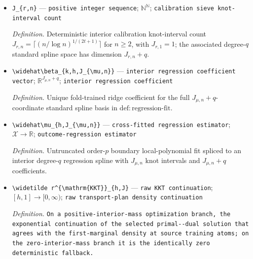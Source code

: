 \documentclass{article}
\begin{document}
\begin{itemize}
  \item \texttt{J\_\allowbreak{}\{r,\allowbreak{}n\}\allowbreak{}} --- \texttt{positive integer sequence}; \(\mathbb N^\mathbb N\); \texttt{calibration sieve knot-\allowbreak{}interval count}
  \par\smallskip\noindent\emph{Definition.} Deterministic interior calibration knot-interval count \(J_{r,n}=\lceil(n/\log n)^{1/(2t+1)}\rceil\) for \(n\ge2\), with \(J_{r,1}=1\); the associated degree-\(q\) standard spline space has dimension \(J_{r,n}+q\).
  \item \texttt{\textbackslash{}\allowbreak{}widehat\textbackslash{}\allowbreak{}beta\_\allowbreak{}\{k,\allowbreak{}h,\allowbreak{}J\_\allowbreak{}\{\textbackslash{}\allowbreak{}mu,\allowbreak{}n\}\allowbreak{}\}\allowbreak{}} --- \texttt{interior regression coefficient vector}; \(\mathbb R^{J_{\mu,n}+q}\); \texttt{interior regression coefficient}
  \par\smallskip\noindent\emph{Definition.} Unique fold-trained ridge coefficient for the full \(J_{\mu,n}+q\)-coordinate standard spline basis in \(\mathrm{def:regression\text{-}fit}\).
  \item \texttt{\textbackslash{}\allowbreak{}widehat\textbackslash{}\allowbreak{}mu\_\allowbreak{}\{h,\allowbreak{}J\_\allowbreak{}\{\textbackslash{}\allowbreak{}mu,\allowbreak{}n\}\allowbreak{}\}\allowbreak{}} --- \texttt{cross-\allowbreak{}fitted regression estimator}; \(\mathcal X\to\mathbb R\); \texttt{outcome-\allowbreak{}regression estimator}
  \par\smallskip\noindent\emph{Definition.} Untruncated order-\(p\) boundary local-polynomial fit spliced to an interior degree-\(q\) regression spline with \(J_{\mu,n}\) knot intervals and \(J_{\mu,n}+q\) coefficients.
  \item \texttt{\textbackslash{}\allowbreak{}widetilde r\textasciicircum{}\{\textbackslash{}\allowbreak{}mathrm\{KKT\}\allowbreak{}\}\allowbreak{}\_\allowbreak{}\{h,\allowbreak{}J\}\allowbreak{}} --- \texttt{raw KKT continuation}; \([h,1]\to[0,\infty)\); \texttt{raw transport-\allowbreak{}plan density continuation}
  \par\smallskip\noindent\emph{Definition.} \texttt{On a positive-\allowbreak{}interior-\allowbreak{}mass optimization branch,\allowbreak{} the exponential continuation of the selected primal-\allowbreak{}-\allowbreak{}dual solution that agrees with the first-\allowbreak{}marginal density at source training atoms;\allowbreak{} on the zero-\allowbreak{}interior-\allowbreak{}mass branch it is the identically zero deterministic fallback.}

\end{itemize}
\end{document}
